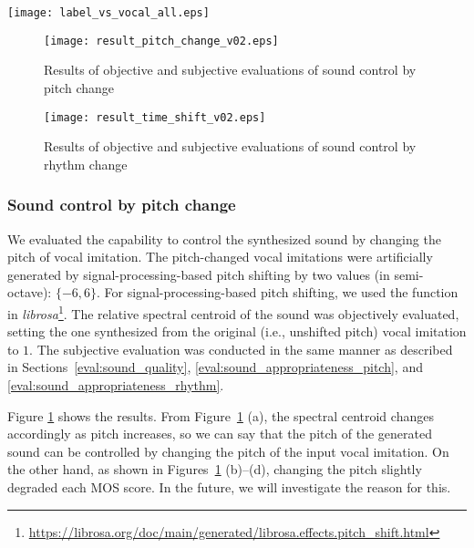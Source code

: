 \documentclass{article}
\begin{document}
%

\begin{figure*}[t]
\centering
\texttt{[image: label\_vs\_vocal\_all.eps]}
\vspace{-8pt}
\caption{MOS distributions: ``Label'' vs ``Label + vocal.'' Blue points mean that ``Label + vocal.'' is superior to ``Label.''}
\label{fig:MOS_distributions}
\vspace{-6pt}
\end{figure*}
%
%
\begin{figure}[t!]
\centering
\texttt{[image: result\_pitch\_change\_v02.eps]}
\vspace{-18pt}
\caption{Results of objective and subjective evaluations of sound control by pitch change}
\label{fig:pitch_change}
\vspace{-10pt}
\end{figure}
%
%
\begin{figure}[t!]
\centering
\texttt{[image: result\_time\_shift\_v02.eps]}
\vspace{-18pt}
\caption{Results of objective and subjective evaluations of sound control by rhythm change}
\label{fig:rhythm_change}
\vspace{-10pt}
\end{figure}
%
%
\vspace{-3pt}
\subsubsection{Sound control by pitch change}
\vspace{-3pt}
\label{eval:pitch_shift}
We evaluated the capability to control the synthesized sound by changing the pitch of vocal imitation.
The pitch-changed vocal imitations were artificially generated by signal-processing-based pitch shifting by two values (in semi-octave): $\{-6, 6\}$.
For signal-processing-based pitch shifting, we used the function in {\it librosa}\footnote{\scriptsize{\url{https://librosa.org/doc/main/generated/librosa.effects.pitch_shift.html}}}.
The relative spectral centroid of the sound was objectively evaluated, setting the one synthesized from the original (i.e., unshifted pitch) vocal imitation to $1$.
The subjective evaluation was conducted in the same manner as described in Sections~\ref{eval:sound_quality}, \ref{eval:sound_appropriateness_pitch}, and \ref{eval:sound_appropriateness_rhythm}.

Figure \ref{fig:pitch_change} shows the results.
From Figure~\ref{fig:pitch_change} (a), the spectral centroid changes accordingly as pitch increases, so we can say that the pitch of the generated sound can be controlled by changing the pitch of the input vocal imitation.
On the other hand, as shown in Figures~\ref{fig:pitch_change} (b)--(d), changing the pitch slightly degraded each MOS score.
In the future,  we will investigate the reason for this.
\end{document}
